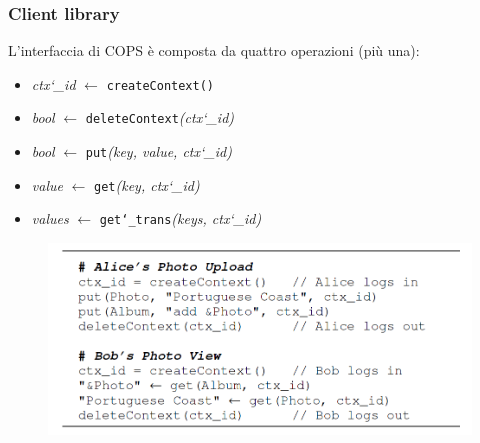 \begin{frame}
\frametitle{Client library}
L'interfaccia di COPS è composta da quattro operazioni (più una):
\begin{itemize}
	\item<1-> \textit{ctx\char`_id} $\leftarrow$ \texttt{createContext()}
	\item<1-> \textit{bool} $\leftarrow$ \texttt{deleteContext}\textit{(ctx\char`_id)}
	\item<1-> \textit{bool} $\leftarrow$ \texttt{put}\textit{(key, value, ctx\char`_id)}
	\item<1-> \textit{value} $\leftarrow$ \texttt{get}\textit{(key, ctx\char`_id)}
	\item<1-> \textit{values} $\leftarrow$ \texttt{get\char`_trans}\textit{(keys, ctx\char`_id)}
\end{itemize}
\begin{figure}
	\centering
	\includegraphics[scale=0.35]{COPS/COPS3.png}
\end{figure}
\end{frame}


